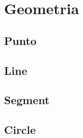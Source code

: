 \newpage
\section{Geometria}

\subsection{Punto}


\subsection{Line}


\subsection{Segment}


\subsection{Circle}


\newpage
